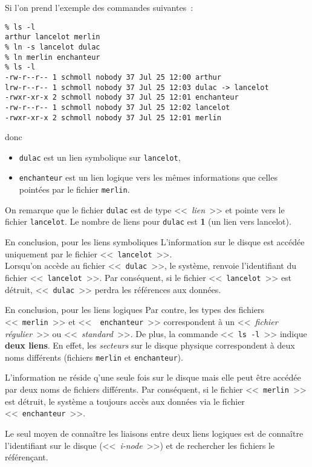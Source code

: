 \begin{example}
Si l'on prend l'exemple des commandes suivantes~:
\begin{verbatim}
% ls -l
arthur lancelot merlin
% ln -s lancelot dulac
% ln merlin enchanteur
% ls -l
-rw-r--r-- 1 schmoll nobody 37 Jul 25 12:00 arthur
lrw-r--r-- 1 schmoll nobody 37 Jul 25 12:03 dulac -> lancelot
-rwxr-xr-x 2 schmoll nobody 37 Jul 25 12:01 enchanteur
-rw-r--r-- 1 schmoll nobody 37 Jul 25 12:02 lancelot
-rwxr-xr-x 2 schmoll nobody 37 Jul 25 12:01 merlin
\end{verbatim}
donc
\begin{itemize}
	\item {\tt dulac} est un lien symbolique sur {\tt lancelot},
	\item {\tt enchanteur} est un lien logique vers les m{\^e}mes informations
			que celles point{\'e}es par le fichier {\tt merlin}.
\end{itemize}

On remarque que le fichier {\tt dulac} est de
type <<~{\sl lien}~>> et pointe vers le fichier {\tt lancelot}. Le
nombre de liens pour {\tt dulac} est {\bf 1} (un lien vers lancelot).
\end{example}

\begin{definition}{En conclusion, pour les liens symboliques}
L'information sur le disque est acc{\'e}d{\'e}e uniquement par le fichier
<<~{\tt lancelot}~>>. \\
Lorsqu'on acc{\`e}de au fichier <<~{\tt dulac}~>>, le syst{\`e}me,
renvoie l'identifiant du fichier  <<~{\tt lancelot}~>>. Par
cons{\'e}quent, si le fichier <<~{\tt lancelot}~>> est d{\'e}truit,
<<~{\tt dulac}~>> perdra les r{\'e}f{\'e}rences aux donn{\'e}es.
\end{definition}

\begin{definition}{En conclusion, pour les liens logiques}
Par contre, les types des fichiers <<~{\tt merlin}~>> et <<~{\tt
enchanteur}~>> correspondent {\`a} un <<~{\sl fichier r{\'e}gulier}~>>
ou <<~{\sl standard}~>>. De plus, la commande <<~{\tt ls -l}~>> indique
{\bf deux liens}. En effet, les {\it secteurs} sur le disque physique
correspondent {\`a} deux noms diff{\'e}rents (fichiers {\tt merlin} et
{\tt enchanteur}).

L'information ne r{\'e}side q'une seule fois sur le disque mais elle
peut {\^e}tre acc{\'e}d{\'e}e par deux noms de fichiers diff{\'e}rents.
Par cons{\'e}quent, si le fichier <<~{\tt merlin}~>> est d{\'e}truit,
le syst{\`e}me a toujours acc{\`e}s aux donn{\'e}es via le fichier
<<~{\tt enchanteur}~>>.

Le seul moyen de conna{\^i}tre les liaisons entre deux liens logiques est de
conna{\^i}tre l'identifiant sur le disque (<<~\textsl{i-node}~>>) et de
rechercher les fichiers le r{\'e}f{\'e}ren\c{c}ant.
\end{definition}

